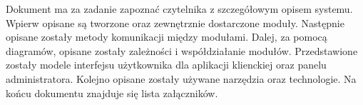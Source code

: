 \documentclass[../praca-dyplomowa.tex]{subfiles}
\begin{document}

\abstract
Dokument ma za zadanie zapoznać czytelnika z szczegółowym opisem systemu.
Wpierw opisane są tworzone oraz zewnętrznie dostarczone moduły.
Następnie opisane zostały metody komunikacji między modułami.
Dalej, za pomocą diagramów, opisane zostały zależności i współdziałanie modułów.
Przedstawione zostały modele interfejsu użytkownika dla aplikacji klienckiej oraz panelu administratora.
Kolejno opisane zostały używane narzędzia oraz technologie.
Na końcu dokumentu znajduje się lista załączników.

\begin{Revisions}
\end{Revisions}

\tableofcontents
\end{document}
